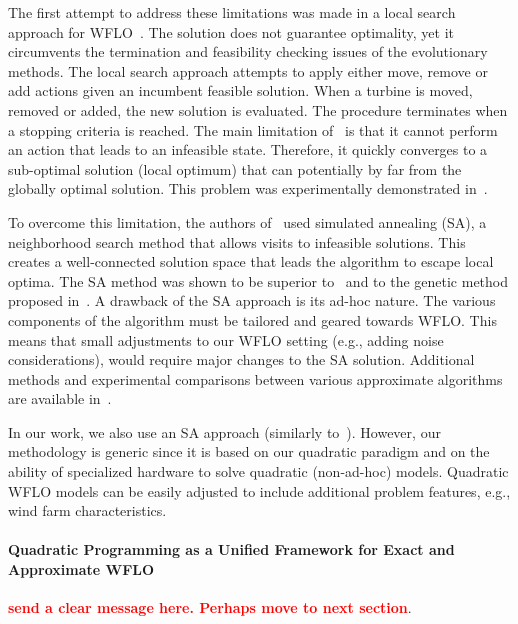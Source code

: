 \documentclass[preprint,12pt]{elsarticle}
\newcommand{\todo}[1]{{\textcolor{red}{\bf {#1}}}}
\begin{document}
The first attempt to address these limitations 
was made in a local search approach for WFLO~\cite{ozturk2004heuristic}. 
The solution does not guarantee optimality, 
yet it circumvents the termination and feasibility checking issues of the evolutionary
methods. The local search approach attempts to apply either move, remove or add actions given an incumbent 
feasible solution. When a turbine is moved, removed or added, the new solution is evaluated. The procedure terminates 
when a stopping criteria is reached.
The main limitation of~\cite{ozturk2004heuristic} is that it cannot perform an action 
that leads to an infeasible state. Therefore, it quickly converges to a sub-optimal solution (local optimum) 
that can potentially by far
from the globally optimal solution. This problem was experimentally demonstrated in~\cite{rivas2009solving}. 

To overcome this limitation, the authors of~\cite{rivas2009solving} used simulated annealing (SA), 
a neighborhood search method that allows visits to infeasible solutions. 
This creates a well-connected solution space that leads the algorithm to escape 
local optima. The SA method was shown to be superior to~\cite{ozturk2004heuristic} 
and to the genetic method proposed in~\cite{grady2005placement}. A drawback of the SA approach 
is its ad-hoc nature. The various components of the algorithm
 must be tailored and geared towards WFLO. This means that small adjustments to our WFLO setting
 (e.g., adding noise considerations), would require major changes to the SA solution. 
Additional methods and experimental comparisons between various approximate algorithms are available in~\cite{samorani2013wind}.

In our work, we also use an SA approach (similarly to~\cite{rivas2009solving}). However,
our methodology is generic since it is based on our quadratic paradigm and
on the ability of specialized hardware to solve quadratic (non-ad-hoc) models.
Quadratic WFLO models can be easily adjusted to include additional problem features, e.g., wind farm characteristics. 

\paragraph{Quadratic Programming as a Unified Framework for Exact and Approximate WFLO}
\todo{send a clear message here. Perhaps move to next section}.
\end{document}
